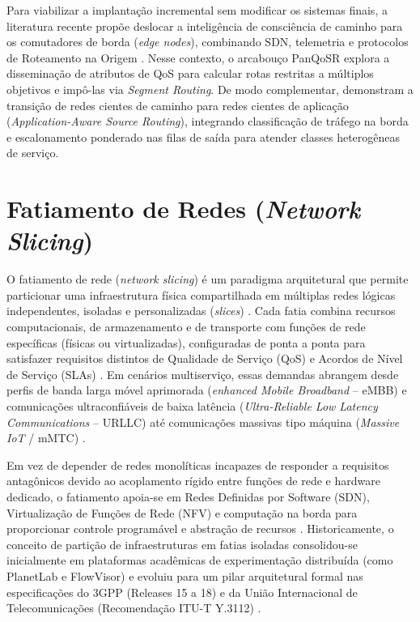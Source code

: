 Para viabilizar a implantação incremental sem modificar os sistemas finais, a literatura recente propõe deslocar a inteligência de consciência de caminho para os comutadores de borda (\textit{edge nodes}), combinando SDN, telemetria e protocolos de Roteamento na Origem \cite{dominicini2020, borges2024pot, wei2026panqosr}. Nesse contexto, o arcabouço PanQoSR \cite{wei2026panqosr} explora a disseminação de atributos de QoS para calcular rotas restritas a múltiplos objetivos e impô-las via \textit{Segment Routing}. De modo complementar, \textcite{puttaswamy2025pathaware} demonstram a transição de redes cientes de caminho para redes cientes de aplicação (\textit{Application-Aware Source Routing}), integrando classificação de tráfego na borda e escalonamento ponderado nas filas de saída para atender classes heterogêneas de serviço.

\section{Fatiamento de Redes (\textit{Network Slicing})}
\label{sec:network_slicing}

O fatiamento de rede (\textit{network slicing}) é um paradigma arquitetural que permite particionar uma infraestrutura física compartilhada em múltiplas redes lógicas independentes, isoladas e personalizadas (\textit{slices}) \cite{afolabi2018network, FoukasXenofon2017NSi5}. Cada fatia combina recursos computacionais, de armazenamento e de transporte com funções de rede específicas (físicas ou virtualizadas), configuradas de ponta a ponta para satisfazer requisitos distintos de Qualidade de Serviço (QoS) e Acordos de Nível de Serviço (SLAs) \cite{itu.y3112, ZhangShunliang2019AOoN}. Em cenários multiserviço, essas demandas abrangem desde perfis de banda larga móvel aprimorada (\textit{enhanced Mobile Broadband} -- eMBB) e comunicações ultraconfiáveis de baixa latência (\textit{Ultra-Reliable Low Latency Communications} -- URLLC) até comunicações massivas tipo máquina (\textit{Massive IoT} / mMTC) \cite{3gpp.23.501, RostPeter2016Mnae}.

Em vez de depender de redes monolíticas incapazes de responder a requisitos antagônicos devido ao acoplamento rígido entre funções de rede e hardware dedicado, o fatiamento apoia-se em Redes Definidas por Software (SDN), Virtualização de Funções de Rede (NFV) e computação na borda para proporcionar controle programável e abstração de recursos \cite{BARAKABITZE2020106984, wijethilaka2021survey}. Historicamente, o conceito de partição de infraestruturas em fatias isoladas consolidou-se inicialmente em plataformas acadêmicas de experimentação distribuída (como PlanetLab e FlowVisor) e evoluiu para um pilar arquitetural formal nas especificações do 3GPP (Releases 15 a 18) \cite{3gpp.23.501, 3gpp.28.530} e da União Internacional de Telecomunicações (Recomendação ITU-T Y.3112) \cite{itu.y3112}.

